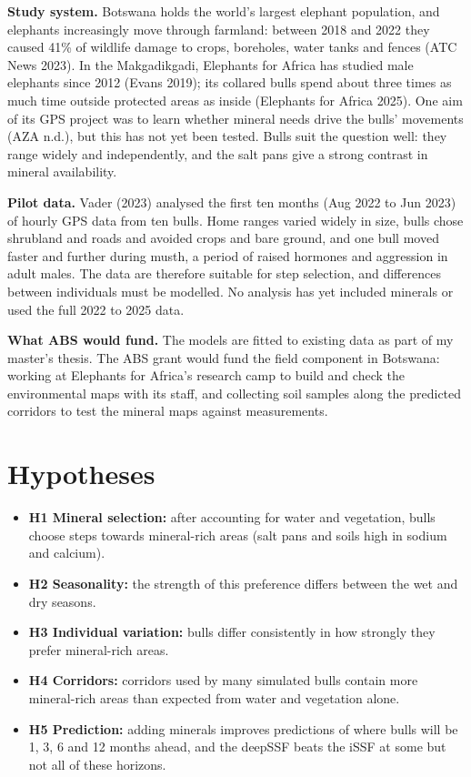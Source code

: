 \documentclass[11pt,a4paper]{article}
\begin{document}
\textbf{Study system.} Botswana holds the world's largest elephant population, and elephants increasingly move through farmland: between 2018 and 2022 they caused 41\% of wildlife damage to crops, boreholes, water tanks and fences (ATC News 2023). In the Makgadikgadi, Elephants for Africa has studied male elephants since 2012 (Evans 2019); its collared bulls spend about three times as much time outside protected areas as inside (Elephants for Africa 2025). One aim of its GPS project was to learn whether mineral needs drive the bulls' movements (AZA n.d.), but this has not yet been tested. Bulls suit the question well: they range widely and independently, and the salt pans give a strong contrast in mineral availability.

\textbf{Pilot data.} Vader (2023) analysed the first ten months (Aug 2022 to Jun 2023) of hourly GPS data from ten bulls. Home ranges varied widely in size, bulls chose shrubland and roads and avoided crops and bare ground, and one bull moved faster and further during musth, a period of raised hormones and aggression in adult males. The data are therefore suitable for step selection, and differences between individuals must be modelled. No analysis has yet included minerals or used the full 2022 to 2025 data.

\textbf{What ABS would fund.} The models are fitted to existing data as part of my master's thesis. The ABS grant would fund the field component in Botswana: working at Elephants for Africa's research camp to build and check the environmental maps with its staff, and collecting soil samples along the predicted corridors to test the mineral maps against measurements.

\section{Hypotheses}
\begin{itemize}
  \item \textbf{H1 Mineral selection:} after accounting for water and vegetation, bulls choose steps towards mineral-rich areas (salt pans and soils high in sodium and calcium).
  \item \textbf{H2 Seasonality:} the strength of this preference differs between the wet and dry seasons.
  \item \textbf{H3 Individual variation:} bulls differ consistently in how strongly they prefer mineral-rich areas.
  \item \textbf{H4 Corridors:} corridors used by many simulated bulls contain more mineral-rich areas than expected from water and vegetation alone.
  \item \textbf{H5 Prediction:} adding minerals improves predictions of where bulls will be 1, 3, 6 and 12 months ahead, and the deepSSF beats the iSSF at some but not all of these horizons.
\end{itemize}
\end{document}
